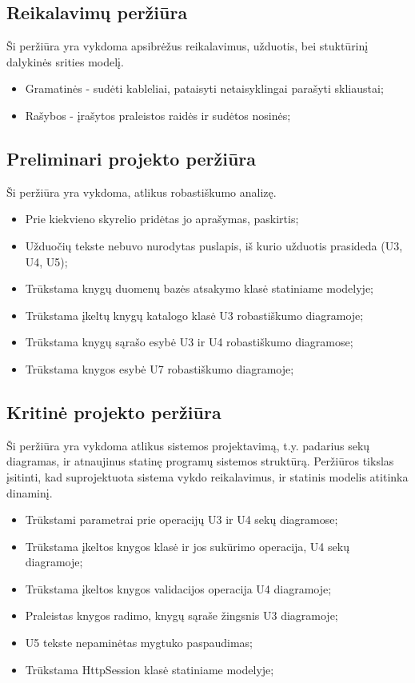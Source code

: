 \documentclass{VUMIFPSkursinis}
\begin{document}
	\subsection{Reikalavimų peržiūra}
		Ši peržiūra yra vykdoma apsibrėžus reikalavimus, užduotis, bei stuktūrinį dalykinės srities modelį.
		\begin{itemize}
			\item Gramatinės - sudėti kableliai, pataisyti netaisyklingai parašyti skliaustai;
			\item Rašybos - įrašytos praleistos raidės ir sudėtos nosinės;
		\end{itemize}
	\subsection{Preliminari projekto peržiūra}
		Ši peržiūra yra vykdoma, atlikus robastiškumo analizę.
		\begin{itemize}
			\item Prie kiekvieno skyrelio pridėtas jo aprašymas, paskirtis;
			\item Užduočių tekste nebuvo nurodytas puslapis, iš kurio užduotis prasideda (U3, U4, U5);
			\item Trūkstama knygų duomenų bazės atsakymo klasė statiniame modelyje;
			\item Trūkstama įkeltų knygų katalogo klasė U3 robastiškumo diagramoje;
			\item Trūkstama knygų sąrašo esybė U3 ir U4 robastiškumo diagramose;
			\item Trūkstama knygos esybė U7 robastiškumo diagramoje;
		\end{itemize}
	\subsection{Kritinė projekto peržiūra}
		Ši peržiūra yra vykdoma atlikus sistemos projektavimą,
		t.y. padarius sekų diagramas, ir atnaujinus statinę programų sistemos struktūrą.
		Peržiūros tikslas įsitinti, kad suprojektuota sistema vykdo reikalavimus,
		ir statinis modelis atitinka dinaminį.
		\begin{itemize}
			\item Trūkstami parametrai prie operacijų U3 ir U4 sekų diagramose;
			\item Trūkstama įkeltos knygos klasė ir jos sukūrimo operacija, U4 sekų diagramoje;
			\item Trūkstama įkeltos knygos validacijos operacija U4 diagramoje;
			\item Praleistas knygos radimo, knygų sąraše žingsnis U3 diagramoje;
			\item U5 tekste nepaminėtas mygtuko paspaudimas;
			\item Trūkstama HttpSession klasė statiniame modelyje;
		\end{itemize}
\setcounter{secnumdepth}{0}
\end{document}
